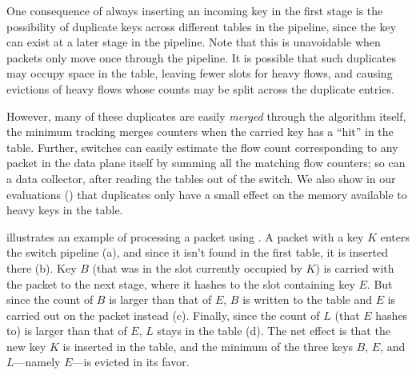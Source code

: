 One consequence of always inserting an incoming key in the first stage is the
possibility of duplicate keys across different tables in the pipeline, since the
key can exist at a later stage in the pipeline. Note that this is unavoidable
when packets only move once through the pipeline. It is possible that such
duplicates may occupy space in the table, leaving fewer slots for heavy flows,
and causing evictions of heavy flows whose counts may be split across the
duplicate entries.

\label{sec:coalescing}
However, many of these duplicates are easily {\em merged} through the algorithm
itself, \ie the minimum tracking merges counters when the carried key has a
``hit'' in the table. Further, switches can easily estimate the flow count
corresponding to any packet in the data plane itself by summing all the matching
flow counters; so can a data collector, after reading the tables out of the
switch. We also show in our evaluations () that
  duplicates only have a small effect on the memory available to heavy keys in the table.

 illustrates an example of processing a packet using \TheSystem. A
packet with a key $K$ enters the switch pipeline (a), and since it isn't found
in the first table, it is inserted there (b). Key $B$ (that was in the slot
currently occupied by $K$) is carried with the packet to the next stage, where
it hashes to the slot containing key $E$. But since the count of $B$ is larger
than that of $E$, $B$ is written to the table and $E$ is carried out on the
packet instead (c). Finally, since the count of $L$ (that $E$ hashes to) is
larger than that of $E$, $L$ stays in the table (d). The net effect is that the new
key $K$ is inserted in the table, and the minimum of the three keys $B$, $E$, and
$L$---namely $E$---is evicted in its favor.



